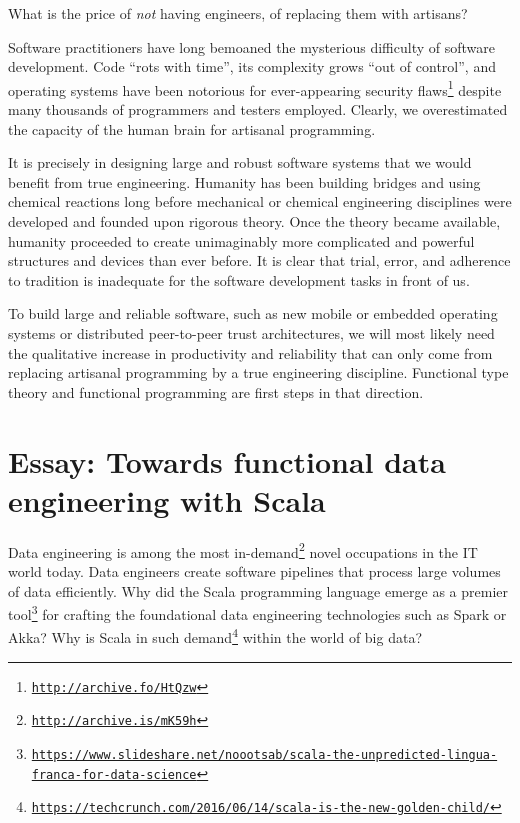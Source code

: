 What is the price of \emph{not} having engineers, of replacing them
with artisans?

Software practitioners have long bemoaned the mysterious difficulty
of software development. Code ``rots with time'', its complexity
grows ``out of control'', and operating systems have been notorious
for ever-appearing security flaws\footnote{\texttt{\href{http://archive.fo/HtQzw}{http://archive.fo/HtQzw}}}
despite many thousands of programmers and testers employed. Clearly,
we overestimated the capacity of the human brain for artisanal programming.

It is precisely in designing large and robust software systems that
we would benefit from true engineering. Humanity has been building
bridges and using chemical reactions long before mechanical or chemical
engineering disciplines were developed and founded upon rigorous theory.
Once the theory became available, humanity proceeded to create unimaginably
more complicated and powerful structures and devices than ever before.
It is clear that trial, error, and adherence to tradition is inadequate
for the software development tasks in front of us. 

To build large and reliable software, such as new mobile or embedded
operating systems or distributed peer-to-peer trust architectures,
we will most likely need the qualitative increase in productivity
and reliability that can only come from replacing artisanal programming
by a true engineering discipline. Functional type theory and functional
programming are first steps in that direction.

\chapter{Essay: Towards functional data engineering with Scala}

Data engineering is among the most in-demand\footnote{\texttt{\href{http://archive.is/mK59h}{http://archive.is/mK59h}}}
novel occupations in the IT world today. Data engineers create software
pipelines that process large volumes of data efficiently. Why did
the Scala programming language emerge as a premier tool\footnote{\texttt{\href{https://www.slideshare.net/noootsab/scala-the-unpredicted-lingua-franca-for-data-science}{https://www.slideshare.net/noootsab/scala-the-unpredicted-lingua-franca-for-data-science}}}
for crafting the foundational data engineering technologies such as
Spark or Akka? Why is Scala in such demand\footnote{\texttt{\href{https://techcrunch.com/2016/06/14/scala-is-the-new-golden-child/}{https://techcrunch.com/2016/06/14/scala-is-the-new-golden-child/}}}
within the world of big data?

